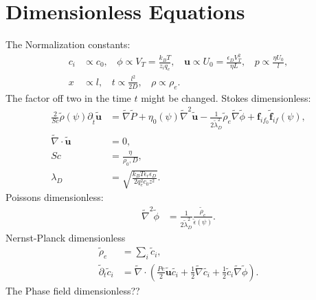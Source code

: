 \documentclass[a4paper,10pt]{article}
\begin{document}
\section{Dimensionless Equations} 
The Normalization constants:
\begin{align}
c_i &\propto c_0, ~~~~ \phi \propto V_T = \frac{k_B T}{z_i q_e}, ~~~~\mathbf{u} \propto U_0 = \frac{\epsilon_D V_T^2}{\eta L}, ~~~~p \propto \frac{\eta U_0}{l},\\
x &\propto l, ~~~~ t \propto \frac{l^2}{2 D}, ~~~~ \rho \propto \rho_e.
\end{align}
The factor off two in the time $t$ might be changed. \newline
Stokes dimensionless:
\begin{align}
\frac{2}{Sc}\tilde{\rho}(\psi) \partial_{\tilde{t}} \tilde{\mathbf{u}}  &=  \tilde{\nabla} \tilde{P} + \eta_0(\psi)\tilde{\nabla}^2 \tilde{\mathbf{u}} - \frac{1}{2\tilde{\lambda}^2_D} \tilde{\rho}_e  \tilde{\nabla} \tilde{\phi} + \mathbf{f}_{if_0} \tilde{\mathbf{f}}_{if}(\psi), \\
\tilde{\nabla }\cdot\tilde{\mathbf{u}} &= 0, \\
Sc &= \frac{\eta}{\rho_0,D}, \\
\lambda_D &= \sqrt{\frac{k_B T \epsilon_r \epsilon_D}{2 q_e^2 c_0 z^2}}.  
\end{align}
Poissons dimensionless: 
\begin{align}
\tilde{\nabla}^2\tilde{\phi}&= \frac{1}{2\tilde{\lambda}_D^2 }\frac{\tilde{\rho}_e}{\tilde{\epsilon}(\psi)}.
\end{align}
Nernst-Planck dimensionless
\begin{align}
\tilde{\rho}_e &= \sum_i \tilde{c}_i, \\
\tilde{\partial}_t\tilde{c}_i &= \tilde{\nabla}\cdot\left(\frac{Pe}{2}\tilde{\mathbf{u}}\tilde{c_i}+\frac{1}{2}\tilde{\nabla}\tilde{c_i}+\frac{1}{2}\tilde{c}_i\tilde{\nabla}\tilde{\phi}\right).
\end{align}
The Phase field dimensionless??
\end{document}

